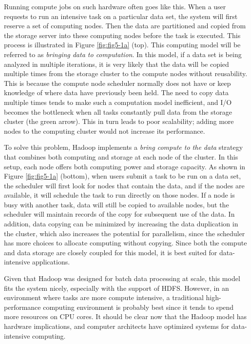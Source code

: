 \documentclass[]{krantz}
\begin{document}
Running compute jobs on such hardware often goes like this. When a user
requests to run an intensive task on a particular data set, the system
will first reserve a set of computing nodes. Then the data are
partitioned and copied from the storage server into these computing
nodes before the task is executed. This process is illustrated in Figure
\ref{fig:fig5-1a} (top). This computing model will be referred to as
\emph{bringing data to computation}. In this model, if a data set is
being analyzed in multiple iterations, it is very likely that the data
will be copied multiple times from the storage cluster to the compute
nodes without reusability. This is because the compute node scheduler
normally does not have or keep knowledge of where data have previously
been held. The need to copy data multiple times tends to make such a
computation model inefficient, and I/O becomes the bottleneck when all
tasks constantly pull data from the storage cluster (the green arrow).
This in turn leads to poor scalability; adding more nodes to the
computing cluster would not increase its performance.

To solve this problem, Hadoop implements a \emph{bring compute to the
data} strategy that combines both computing and storage at each node of
the cluster. In this setup, each node offers both computing power and
storage capacity. As shown in Figure \ref{fig:fig5-1a} (bottom), when
users submit a task to be run on a data set, the scheduler will first
look for nodes that contain the data, and if the nodes are available, it
will schedule the task to run directly on those nodes. If a node is busy
with another task, data will still be copied to available nodes, but the
scheduler will maintain records of the copy for subsequent use of the
data. In addition, data copying can be minimized by increasing the data
duplication in the cluster, which also increases the potential for
parallelism, since the scheduler has more choices to allocate computing
without copying. Since both the compute and data storage are closely
coupled for this model, it is best suited for data-intensive
applications.

Given that Hadoop was designed for batch data processing at scale, this
model fits the system nicely, especially with the support of HDFS.
However, in an environment where tasks are more compute intensive, a
traditional high-performance computing environment is probably best
since it tends to spend more resources on CPU cores. It should be clear
now that the Hadoop model has hardware implications, and computer
architects have optimized systems for data-intensive computing.
\end{document}
